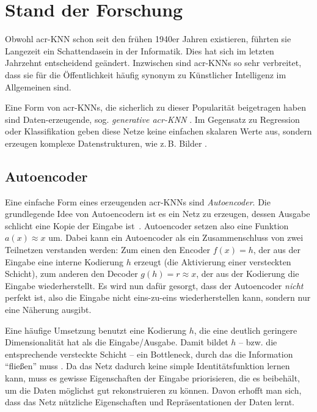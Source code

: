 \chapter{Stand der Forschung}\label{chp:forschungsstand} %
\glsresetall

Obwohl \gls{acr-KNN} schon seit den frühen 1940er Jahren existieren, führten sie
Langezeit ein Schattendasein in der Informatik. Dies hat sich im letzten
Jahrzehnt entscheidend geändert. Inzwischen sind \gls{acr-KNN}s so sehr
verbreitet, dass sie für die Öffentlichkeit häufig synonym zu Künstlicher
Intelligenz im Allgemeinen sind.

Eine Form von \gls{acr-KNN}s, die
sicherlich zu dieser Popularität beigetragen haben sind Da\-ten-\-er\-zeu\-gen\-de, sog.
\emph{generative \gls{acr-KNN}} \cite{goodfellow2014generative,
kingma2019introduction}. Im Gegensatz zu Regression oder Klassifikation geben
diese Netze keine einfachen skalaren Werte aus, sondern erzeugen komplexe
Datenstrukturen, wie z.\,B. Bilder \cite{goodfellow2016deep}.

\section{Autoencoder}

Eine einfache Form eines erzeugenden \gls{acr-KNN}s sind
\emph{Autoencoder}. Die grundlegende Idee von Autoencodern ist es ein Netz zu
erzeugen, dessen Ausgabe schlicht eine Kopie der Eingabe ist~\cite{goodfellow2016deep}. Autoencoder setzen also eine Funktion $a(x) \approx x$
um. Dabei kann ein Autoencoder als ein Zusammenschluss von zwei Teilnetzen
verstanden werden: Zum einen den Encoder $f(x) = h$, der aus der Eingabe eine
interne Kodierung $h$ erzeugt (die Aktivierung einer versteckten Schicht), zum
anderen den Decoder $g(h) = r \approx x$, der aus der Kodierung die Eingabe
wiederherstellt. Es wird nun dafür gesorgt, dass der Autoencoder \emph{nicht}
perfekt ist, also die Eingabe nicht eins-zu-eins wiederherstellen kann, sondern
nur eine Näherung ausgibt.

Eine häufige Umsetzung benutzt eine Kodierung $h$,
die eine deutlich geringere Dimensionalität hat als die Eingabe/Ausgabe. Damit
bildet $h$ – bzw. die entsprechende versteckte Schicht – ein Bottleneck, durch das
die Information \enquote{fließen} muss \cites{goodfellow2016deep}{raschka2019}. Da das Netz dadurch keine simple
Identitätsfunktion lernen kann, muss es gewisse Eigenschaften der Eingabe
priorisieren, die es beibehält, um die Daten möglichst gut rekonstruieren zu können.
Davon erhofft man sich, dass das Netz nützliche Eigenschaften und
Repräsentationen der Daten lernt.

